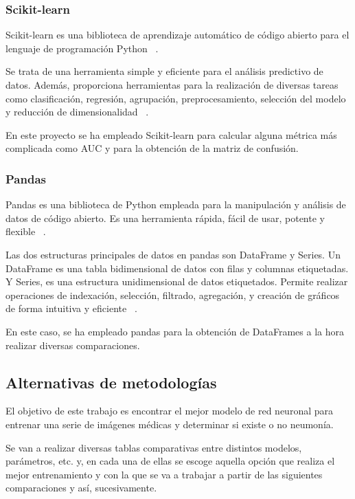 \subsubsection{Scikit-learn}

Scikit-learn es una biblioteca de aprendizaje automático de código abierto para el lenguaje de programación Python ~\cite{wikisclearn24}.

Se trata de una herramienta simple y eficiente para el análisis predictivo de datos. Además, proporciona herramientas para la realización de diversas tareas como clasificación, regresión, agrupación, preprocesamiento, selección del modelo y reducción de dimensionalidad ~\cite{sclearn24}.

En este proyecto se ha empleado Scikit-learn para calcular alguna métrica más complicada como AUC y para la obtención de la matriz de confusión.

\subsubsection{Pandas}

Pandas es una biblioteca de Python empleada para la manipulación y análisis de datos de código abierto. Es una herramienta rápida, fácil de usar, potente y flexible ~\cite{pandas24}. 

Las dos estructuras principales de datos en pandas son DataFrame y Series. Un DataFrame es una tabla bidimensional de datos con filas y columnas etiquetadas. Y Series, es una estructura unidimensional de datos etiquetados. Permite realizar operaciones de indexación, selección, filtrado, agregación, y creación de gráficos de forma intuitiva y eficiente ~\cite{gamco24}.

En este caso, se ha empleado pandas para la obtención de DataFrames a la hora realizar diversas comparaciones.

\subsection{Alternativas de metodologías}
El objetivo de este trabajo es encontrar el mejor modelo de red neuronal para entrenar una serie de imágenes médicas y determinar si existe o no neumonía.

Se van a realizar diversas tablas comparativas entre distintos modelos, parámetros, etc. y, en cada una de ellas se escoge aquella opción que realiza el mejor entrenamiento y con la que se va a trabajar a partir de las siguientes comparaciones y así, sucesivamente.

